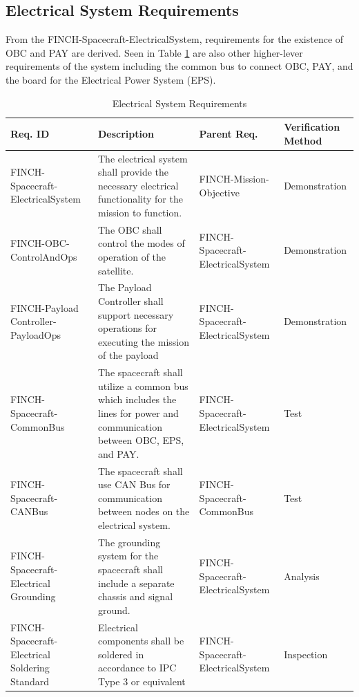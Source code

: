 \documentclass[12pt,a4paper]{article}
\begin{document}
\subsection{Electrical System Requirements}
From the FINCH-Spacecraft-ElectricalSystem, requirements for the existence of OBC and PAY are derived. Seen in Table \ref{tab:elec_sys_req} are also other higher-lever requirements of the system including the common bus to connect OBC, PAY, and the board for the Electrical Power System (EPS).
\begin{table}[H]
  \centering
  \begin{tabular}{|>{\centering\arraybackslash}m{3cm}
    |>{\raggedright\arraybackslash}m{7cm}
    |>{\centering\arraybackslash}m{3cm}
    |>{\centering\arraybackslash}m{2.5cm}|}\hline
    \textbf{Req. ID}                               & \centering \textbf{Description}                                                                                           & \textbf{Parent Req.}              & \textbf{Verification Method} \\\hline
    FINCH-Spacecraft-ElectricalSystem              & The electrical system shall provide the necessary electrical functionality for the mission to function.                   & FINCH-Mission-Objective           & Demonstration                \\\hline
    FINCH-OBC-ControlAndOps                        & The OBC shall control the modes of operation of the satellite.                                                            & FINCH-Spacecraft-ElectricalSystem & Demonstration                \\\hline
    FINCH-Payload Controller-PayloadOps            & The Payload Controller shall support necessary operations for executing the mission of the payload                        & FINCH-Spacecraft-ElectricalSystem & Demonstration                \\\hline
    FINCH-Spacecraft-CommonBus                     & The spacecraft shall utilize a common bus which includes the lines for power and communication between OBC, EPS, and PAY. & FINCH-Spacecraft-ElectricalSystem & Test                         \\\hline
    FINCH-Spacecraft-CANBus                        & The spacecraft shall use CAN Bus for communication between nodes on the electrical system.                                & FINCH-Spacecraft-CommonBus        & Test                         \\\hline
    FINCH-Spacecraft-Electrical Grounding          & The grounding system for the spacecraft shall include a separate chassis and signal ground.                               & FINCH-Spacecraft-ElectricalSystem & Analysis                     \\\hline
    FINCH-Spacecraft-Electrical Soldering Standard & Electrical components shall be soldered in accordance to IPC Type 3 or equivalent                                         & FINCH-Spacecraft-ElectricalSystem & Inspection                   \\\hline
  \end{tabular}
  \caption{Electrical System Requirements}\label{tab:elec_sys_req}
\end{table}
\end{document}
